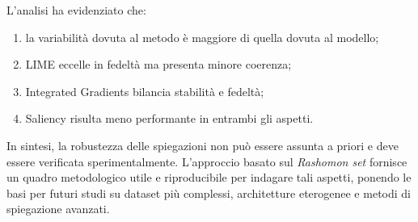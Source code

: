 \documentclass[12pt,a4paper,oneside]{report}
\numberwithin{figure}{chapter}
\numberwithin{table}{chapter}
\begin{document}
L’analisi ha evidenziato che:
\begin{enumerate}
      \item la variabilità dovuta al metodo è maggiore di quella dovuta al modello;
      \item LIME eccelle in fedeltà ma presenta minore coerenza;
      \item Integrated Gradients bilancia stabilità e fedeltà;
      \item Saliency risulta meno performante in entrambi gli aspetti.
\end{enumerate}

In sintesi, la robustezza delle spiegazioni non può essere assunta a priori e
deve essere verificata sperimentalmente. L’approccio basato sul \emph{Rashomon
      set} fornisce un quadro metodologico utile e riproducibile per indagare tali
aspetti, ponendo le basi per futuri studi su dataset più complessi,
architetture eterogenee e metodi di spiegazione avanzati.

\clearpage


\end{document}
